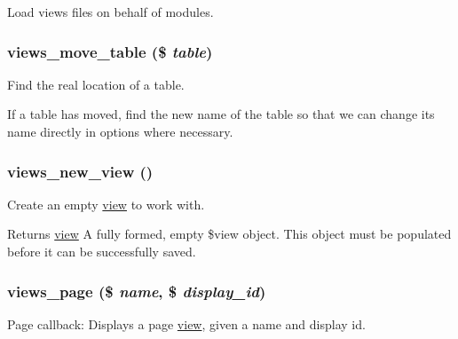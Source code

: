 \label{views_8module_a22df4c2332b9999ad29f8e2771cf63b1}
Load views files on behalf of modules. \hypertarget{views_8module_a06896a9ace9eb509293d9d915710562d}{
\subsubsection[{views\_\-move\_\-table}]{\setlength{\rightskip}{0pt plus 5cm}views\_\-move\_\-table (\$ {\em table})}}
\label{views_8module_a06896a9ace9eb509293d9d915710562d}
Find the real location of a table.

If a table has moved, find the new name of the table so that we can change its name directly in options where necessary. \hypertarget{views_8module_a6ebd20c8c63a43de53643809db0fd1f5}{
\subsubsection[{views\_\-new\_\-view}]{\setlength{\rightskip}{0pt plus 5cm}views\_\-new\_\-view ()}}
\label{views_8module_a6ebd20c8c63a43de53643809db0fd1f5}
Create an empty \hyperlink{classview}{view} to work with.

\begin{DoxyReturn}{Returns}
\hyperlink{classview}{view} A fully formed, empty \$view object. This object must be populated before it can be successfully saved. 
\end{DoxyReturn}
\hypertarget{views_8module_a1cbb11f8adc6fbfecb3a029ab2973cff}{
\subsubsection[{views\_\-page}]{\setlength{\rightskip}{0pt plus 5cm}views\_\-page (\$ {\em name}, \/  \$ {\em display\_\-id})}}
\label{views_8module_a1cbb11f8adc6fbfecb3a029ab2973cff}
Page callback: Displays a page \hyperlink{classview}{view}, given a name and display id.


